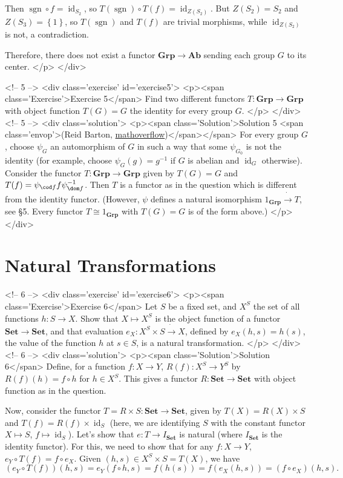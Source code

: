Then $\operatorname{sgn}\circ f=\operatorname{id}_{S_2}$, so $T(\operatorname{sgn})\circ T(f)=\operatorname{id}_{Z(S_2)}$. But $Z(S_2)=S_2$ and $Z(S_3)=\left\{1\right\}$, so $T(\operatorname{sgn})$ and $T(f)$ are trivial morphisms, while $\operatorname{id}_{Z(S_2)}$ is not, a contradiction.

Therefore, there does not exist a functor $\mathbf{Grp}\to\mathbf{Ab}$ sending each group $G$ to its center.
</p>
</div>

<!-- 5 -->
<div class='exercise' id='exercise5'>
<p><span class='Exercise'>Exercise 5</span>
Find two different functors $T:\mathbf{Grp}\to\mathbf{Grp}$ with object function $T(G)=G$ the identity for every group $G$.
</p>
</div>
<!-- 5 -->
<div class='solution'>
<p><span class='Solution'>Solution 5 <span class='envop'>(Reid Barton, \href{http://mathoverflow.net/questions/4276/two-functors-from-grp-to-grp}{mathoverflow})</span></span>
For every group $G$, choose $\psi_G$ an automorphism of $G$ in such a way that some $\psi_{G_0}$ is not the identity (for example, choose $\psi_G(g)=g^{-1}$ if $G$ is abelian and $\operatorname{id}_G$ otherwise). Consider the functor $T:\mathbf{Grp}\to\mathbf{Grp}$ given by $T(G)=G$ and $T(f)=\psi_{\cod f}f\psi_{\dom f}^{-1}$. Then $T$ is a functor as in the question which is different from the identity functor. (However, $\psi$ defines a natural isomorphism $1_\mathbf{Grp}\dot{\to} T$, see \S 5. Every functor $T\cong 1_{\mathbf{Grp}}$ with $T(G)=G$ is of the form above.)
</p>
</div>

\section{Natural Transformations}

<!-- 6 -->
<div class='exercise' id='exercise6'>
<p><span class='Exercise'>Exercise 6</span>
Let $S$ be a fixed set, and $X^S$ the set of all functions $h:S\to X$. Show that $X\mapsto X^S$ is the object function of a functor $\mathbf{Set}\to \mathbf{Set}$, and that evaluation $e_X:X^S\times S\dot{\to}X$, defined by $e_X(h,s)=h(s)$, the value of the function $h$ at $s\in S$, is a natural transformation.
</p>
</div>
<!-- 6 -->
<div class='solution'>
<p><span class='Solution'>Solution 6</span>
Define, for a function $f:X\to Y$, $R(f):X^S\to Y^S$ by $R(f)(h)=f\circ h$ for $h\in X^S$. This gives a functor $R:\mathbf{Set}\to\mathbf{Set}$ with object function as in the question.

Now, consider the functor $T=R\times S\colon\mathbf{Set}\to\mathbf{Set}$, given by $T(X)=R(X)\times S$ and $T(f)=R(f)\times\operatorname{id}_S$ (here, we are identifying $S$ with the constant functor $X\mapsto S$, $f\mapsto \operatorname{id}_S$). Let's show that $e:T\to I_\mathbf{Set}$ is natural (where $I_\mathbf{Set}$ is the identity functor). For this, we need to show that for any $f:X\to Y$, $e_Y\circ T(f)=f\circ e_X$. Given $(h,s)\in X^S\times S=T(X)$, we have
\[(e_Y\circ T(f))(h,s)=e_Y(f\circ h,s)=f(h(s))=f(e_X(h,s))=(f\circ e_X)(h,s).\]

